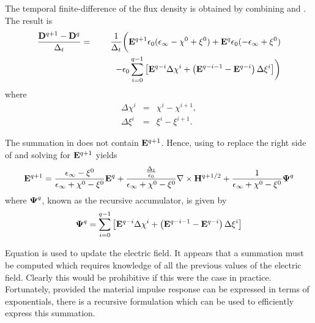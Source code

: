 The temporal finite-difference of the flux density is obtained by
combining  and .  The result is
\begin{eqnarray}
  \frac{\mathbf{D}^{q+1} - \mathbf{D}^{q}}{\Delta_t} &=& 
  \frac{1}{\Delta_t}\biggl(
    \mathbf{E}^{q+1} 
     \epsilon_0(\epsilon_\infty - \chi^0 + \xi^0)
     + \mathbf{E}^q \epsilon_0(-\epsilon_\infty + \xi^0) \nonumber\\
  &&\qquad-
     \epsilon_0\sum_{i=0}^{q-1}\left[
    \mathbf{E}^{q-i} \Delta\chi^{i}
    + \left(\mathbf{E}^{q-i-1}-\mathbf{E}^{q-i}\right)\Delta\xi^{i}\right]
	\biggr)
   \label{eq:plrcDdifference}
\end{eqnarray}
where
\begin{eqnarray}
  \Delta\chi^i &=& \chi^i -  \chi^{i+1}, \\
  \Delta\xi^i &=& \xi^i -  \xi^{i+1}.
\end{eqnarray}

The summation in  does not contain
$\mathbf{E}^{q+1}$.  Hence, using  to replace the
right side of  and solving for $\mathbf{E}^{q+1}$
yields
\begin{equation}
  \mathbf{E}^{q+1}  = 
    \frac{\epsilon_\infty - \xi^0}{\epsilon_\infty + \chi^0 - \xi^0}
    \mathbf{E}^q
    +
    \frac{\frac{\Delta_t}{\epsilon_0}}{\epsilon_\infty + \chi^0 - \xi^0} 
    \nabla\times\mathbf{H}^{q+1/2} + 
    \frac{1}{\epsilon_\infty + \chi^0 - \xi^0} \boldsymbol{\Psi}^q
  \label{eq:plrcEUpdate}
\end{equation}
where $\boldsymbol{\Psi}^q$, known as the recursive accumulator, is given by
\begin{equation}
  \boldsymbol{\Psi}^q = \sum_{i=0}^{q-1}\left[
    \mathbf{E}^{q-i} \Delta\chi^{i}
    + \left(\mathbf{E}^{q-i-1}-\mathbf{E}^{q-i}\right)\Delta\xi^{i}\right]
  \label{eq:plrcPsiDef}
\end{equation}

Equation  is used to update the electric field.
It appears that a summation must be computed which requires knowledge
of all the previous values of the electric field.  Clearly this would
be prohibitive if this were the case in practice.  Fortunately,
provided the material impulse response can be expressed in terms of
exponentials, there is a recursive formulation which can be used to
efficiently express this summation.

